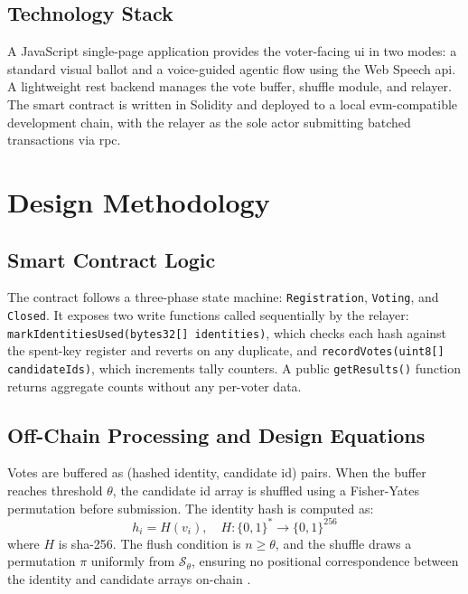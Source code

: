 \subsection{Technology Stack}
 
A JavaScript single-page application provides the voter-facing \gls{ui} in two modes: a standard visual ballot and a voice-guided agentic flow using the Web Speech \gls{api}. A lightweight \gls{rest} backend manages the vote buffer, shuffle module, and relayer. The smart contract is written in Solidity and deployed to a local \gls{evm}-compatible development chain, with the relayer as the sole actor submitting batched transactions via \gls{rpc}.
 
\section{Design Methodology}
 
\subsection{Smart Contract Logic}
 
The contract follows a three-phase state machine: \texttt{Registration}, \texttt{Voting}, and \texttt{Closed}. It exposes two write functions called sequentially by the relayer: \texttt{markIdentitiesUsed(bytes32[] identities)}, which checks each hash against the spent-key register and reverts on any duplicate, and \texttt{recordVotes(uint8[] candidateIds)}, which increments tally counters. A public \texttt{getResults()} function returns aggregate counts without any per-voter data.
 
\subsection{Off-Chain Processing and Design Equations}
 
Votes are buffered as (hashed identity, candidate \gls{id}) pairs. When the buffer reaches threshold $\theta$, the candidate \gls{id} array is shuffled using a Fisher-Yates permutation before submission. The identity hash is computed as:
\begin{equation}
    h_i = H(v_i), \quad H : \{0,1\}^* \rightarrow \{0,1\}^{256}
    \label{eq:identity_hash}
\end{equation}
where $H$ is \gls{sha}-256. The flush condition is $n \geq \theta$, and the shuffle draws a permutation $\pi$ uniformly from $\mathcal{S}_\theta$, ensuring no positional correspondence between the identity and candidate arrays on-chain \cite{Wang2023}.
 

